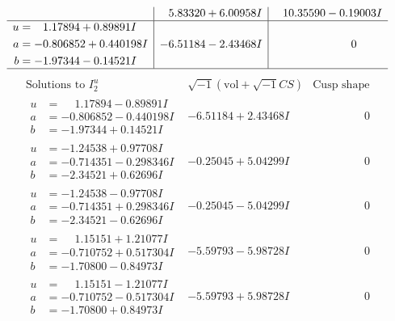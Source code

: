 \documentclass[1p]{elsarticle_modified}
\theoremstyle{definition}
\newcommand{\I}{\sqrt{-1}}
\begin{document}
$$\begin{array}{c|c|c}
 & \phantom{-}5.83320 + 6.00958 I & \phantom{-}10.35590 - 0.19003 I \\ \hline\begin{aligned}
u &= \phantom{-}1.17894 + 0.89891 I \\
a &= -0.806852 + 0.440198 I \\
b &= -1.97344 - 0.14521 I\end{aligned}
 & -6.51184 - 2.43468 I & \phantom{-0.000000 } 0\\
 \hline 
 \end{array}$$\newpage$$\begin{array}{c|c|c}  
\text{Solutions to }I^u_{2}& \I (\text{vol} + \sqrt{-1}CS) & \text{Cusp shape}\\
 \hline 
\begin{aligned}
u &= \phantom{-}1.17894 - 0.89891 I \\
a &= -0.806852 - 0.440198 I \\
b &= -1.97344 + 0.14521 I\end{aligned}
 & -6.51184 + 2.43468 I & \phantom{-0.000000 } 0 \\ \hline\begin{aligned}
u &= -1.24538 + 0.97708 I \\
a &= -0.714351 - 0.298346 I \\
b &= -2.34521 + 0.62696 I\end{aligned}
 & -0.25045 + 5.04299 I & \phantom{-0.000000 } 0 \\ \hline\begin{aligned}
u &= -1.24538 - 0.97708 I \\
a &= -0.714351 + 0.298346 I \\
b &= -2.34521 - 0.62696 I\end{aligned}
 & -0.25045 - 5.04299 I & \phantom{-0.000000 } 0 \\ \hline\begin{aligned}
u &= \phantom{-}1.15151 + 1.21077 I \\
a &= -0.710752 + 0.517304 I \\
b &= -1.70800 - 0.84973 I\end{aligned}
 & -5.59793 - 5.98728 I & \phantom{-0.000000 } 0 \\ \hline\begin{aligned}
u &= \phantom{-}1.15151 - 1.21077 I \\
a &= -0.710752 - 0.517304 I \\
b &= -1.70800 + 0.84973 I\end{aligned}
 & -5.59793 + 5.98728 I & \phantom{-0.000000 } 0 \\ \hline\begin{aligned}

\end{aligned}
\end{array}$$
\end{document}
